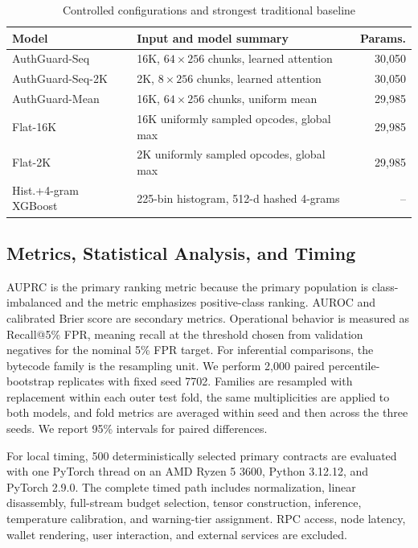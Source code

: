 \documentclass[conference]{IEEEtran}
\begin{document}
\begin{table}[t]
\centering
\caption{Controlled configurations and strongest traditional baseline}
\label{tab:baseline-config}
\scriptsize
\begin{tabularx}{\columnwidth}{@{}l X r@{}}
\toprule
Model & Input and model summary & Params. \\
\midrule
AuthGuard-Seq & 16K, $64\times256$ chunks, learned attention & 30,050 \\
AuthGuard-Seq-2K & 2K, $8\times256$ chunks, learned attention & 30,050 \\
AuthGuard-Mean & 16K, $64\times256$ chunks, uniform mean & 29,985 \\
Flat-16K & 16K uniformly sampled opcodes, global max & 29,985 \\
Flat-2K & 2K uniformly sampled opcodes, global max & 29,985 \\
Hist.+4-gram XGBoost & 225-bin histogram, 512-d hashed 4-grams & -- \\
\bottomrule
\end{tabularx}
\end{table}




\subsection{Metrics, Statistical Analysis, and Timing}

AUPRC is the primary ranking metric because the primary population is class-imbalanced and the metric emphasizes positive-class ranking. AUROC and calibrated Brier score are secondary metrics. Operational behavior is measured as Recall@5\% FPR, meaning recall at the threshold chosen from validation negatives for the nominal 5\% FPR target. For inferential comparisons, the bytecode family is the resampling unit. We perform 2,000 paired percentile-bootstrap replicates with fixed seed 7702. Families are resampled with replacement within each outer test fold, the same multiplicities are applied to both models, and fold metrics are averaged within seed and then across the three seeds. We report 95\% intervals for paired differences.

For local timing, 500 deterministically selected primary contracts are evaluated with one PyTorch thread on an AMD Ryzen 5 3600, Python 3.12.12, and PyTorch 2.9.0. The complete timed path includes normalization, linear disassembly, full-stream budget selection, tensor construction, inference, temperature calibration, and warning-tier assignment. RPC access, node latency, wallet rendering, user interaction, and external services are excluded.
\end{document}
